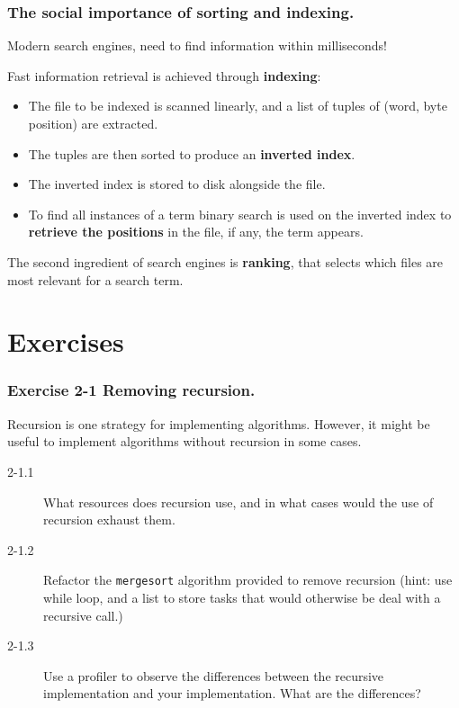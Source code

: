 \documentclass{beamer} %
\newcommand\emc[1]{\textcolor{brightblue}{\textbf{#1}}}
\begin{document}
\begin{frame}
\frametitle{The social importance of sorting and indexing.}

Modern search engines, need to find information within milliseconds!

\vspace{3mm}
Fast information retrieval is achieved through \emc{indexing}:
\begin{itemize}
	\item The file to be indexed is scanned linearly, and a list of tuples of (word, byte position) are extracted.
	\item The tuples are then sorted to produce an \emc{inverted index}.
	\item The inverted index is stored to disk alongside the file.
	\item To find all instances of a term binary search is used on the inverted index to \emc{retrieve the positions} in the file, if any, the term appears.
\end{itemize}

The second ingredient of search engines is \emc{ranking}, that selects which files are most relevant for a search term.
\end{frame}




\section{Exercises}

\begin{frame}
\frametitle{Exercise 2-1 Removing recursion.}

Recursion is one strategy for implementing algorithms. However, it might be useful to implement algorithms without recursion in some cases.
\begin{description}
	\item[2-1.1] What resources does recursion use, and in what cases would the use of recursion exhaust them.
	\item[2-1.2] Refactor the \texttt{mergesort} algorithm provided to remove recursion (hint: use while loop, and a list to store tasks that would otherwise be deal with a recursive call.)
	\item[2-1.3] Use a profiler to observe the differences between the recursive implementation and your implementation. What are the differences?
\end{description}

\end{frame}
\end{document}
